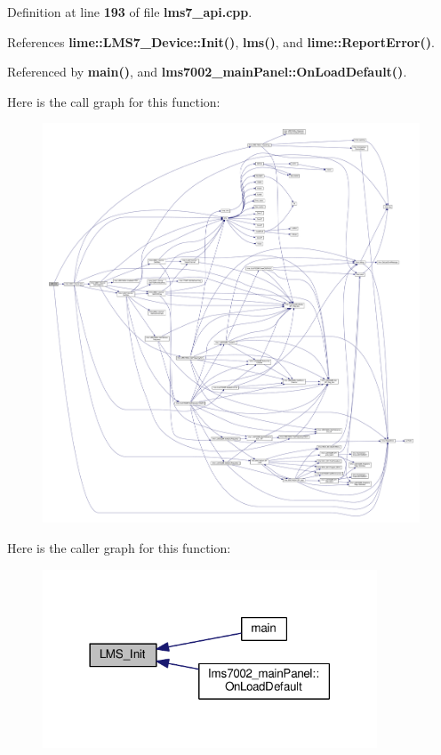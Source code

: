 Definition at line {\bf 193} of file {\bf lms7\+\_\+api.\+cpp}.



References {\bf lime\+::\+L\+M\+S7\+\_\+\+Device\+::\+Init()}, {\bf lms()}, and {\bf lime\+::\+Report\+Error()}.



Referenced by {\bf main()}, and {\bf lms7002\+\_\+main\+Panel\+::\+On\+Load\+Default()}.



Here is the call graph for this function\+:
\nopagebreak
\begin{figure}[H]
\begin{center}
\leavevmode
\includegraphics[width=350pt]{df/de1/lms7__api_8cpp_a804769c6df1bb5c86829f6211c0c56aa_cgraph}
\end{center}
\end{figure}




Here is the caller graph for this function\+:
\nopagebreak
\begin{figure}[H]
\begin{center}
\leavevmode
\includegraphics[width=282pt]{df/de1/lms7__api_8cpp_a804769c6df1bb5c86829f6211c0c56aa_icgraph}
\end{center}
\end{figure}


